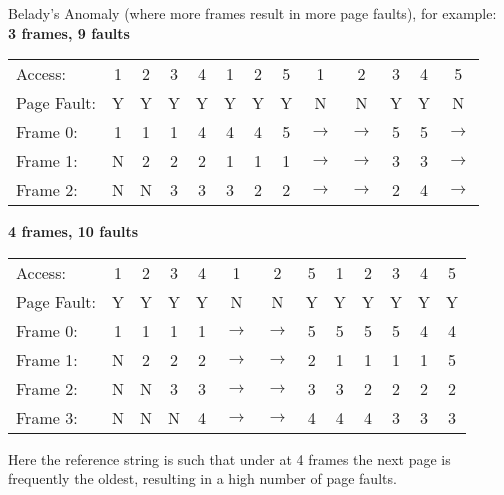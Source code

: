 \documentclass{report}
\begin{document}
                Belady's Anomaly (where more frames result in more page faults), for example:
                \\ \textbf{3 frames, 9 faults}
                \begin{center}
                    \begin{tabular}{l c c c c c c c c c c c c} 
                        Access:     & 1 & 2 & 3 & 4 & 1 & 2 & 5 & 1 & 2 & 3 & 4 & 5 \\
                        Page Fault: & Y & Y & Y & Y & Y & Y & Y & N & N & Y & Y & N \\
                        Frame 0:    & 1 & 1 & 1 & 4 & 4 & 4 & 5 & $\to$ & $\to$ & 5 & 5 & $\to$ \\
                        Frame 1:    & N & 2 & 2 & 2 & 1 & 1 & 1 & $\to$ & $\to$ & 3 & 3 & $\to$ \\
                        Frame 2:    & N & N & 3 & 3 & 3 & 2 & 2 & $\to$ & $\to$ & 2 & 4 & $\to$ \\
                    \end{tabular}
                \end{center}
                \textbf{4 frames, 10 faults}
                \begin{center}
                    \begin{tabular}{l c c c c c c c c c c c c}
                        Access:     & 1 & 2 & 3 & 4 & 1 & 2 & 5 & 1 & 2 & 3 & 4 & 5 \\
                        Page Fault: & Y & Y & Y & Y & N & N & Y & Y & Y & Y & Y & Y \\
                        Frame 0:    & 1 & 1 & 1 & 1 & $\to$ & $\to$ & 5 & 5 & 5 & 5 & 4 & 4 \\
                        Frame 1:    & N & 2 & 2 & 2 & $\to$ & $\to$ & 2 & 1 & 1 & 1 & 1 & 5 \\
                        Frame 2:    & N & N & 3 & 3 & $\to$ & $\to$ & 3 & 3 & 2 & 2 & 2 & 2 \\
                        Frame 3:    & N & N & N & 4 & $\to$ & $\to$ & 4 & 4 & 4 & 3 & 3 & 3 \\
                    \end{tabular}
                \end{center}
                Here the reference string is such that under  at 4 frames the next page is frequently the oldest, resulting in a high number of page faults.
\end{document}
